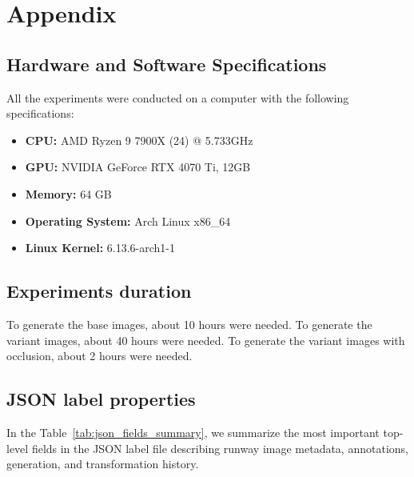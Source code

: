 \chapter{Appendix}


\section{Hardware and Software Specifications}

All the experiments were conducted on a computer with the following
specifications:
\begin{itemize}
    \item \textbf{CPU:} AMD Ryzen 9 7900X (24) @ 5.733GHz
    \item \textbf{GPU:} NVIDIA GeForce RTX 4070 Ti, 12GB
    \item \textbf{Memory:} 64 GB
    \item \textbf{Operating System:} Arch Linux x86\_64
    \item \textbf{Linux Kernel:} 6.13.6-arch1-1
\end{itemize}

\section{Experiments duration}

To generate the base images, about 10 hours were needed. To generate
the variant images, about 40 hours were needed. To generate the variant images
with occlusion, about 2 hours were needed.

\section{JSON label properties}

In the Table~\ref{tab:json_fields_summary}, we summarize the most important top-level fields in the JSON label file describing runway image metadata, annotations, generation, and transformation history.

